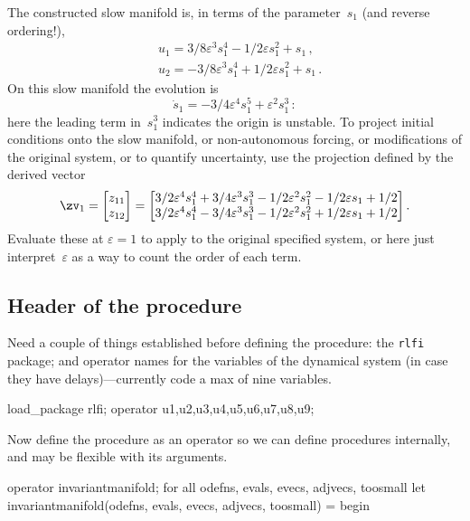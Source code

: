 \documentclass[11pt,a5paper]{article}
\def\eps{\varepsilon}
\begin{document}
The constructed slow manifold is, in terms of the
parameter~\(s_1\) (and reverse ordering!), 
\begin{align*}&
u_{1}=3/8 \eps^{3} s_{1}^{4}-1/2 \eps s_{1}^{2}+s_{1}\,,
\\&
u_{2}=-3/8 \eps^{3} s_{1}^{4}+1/2 \eps s_{1}^{2}+s_{1}\,.
\end{align*}
On this slow manifold the evolution is
\begin{equation*}
\dot s_{1}=-3/4 \eps^{4} s_{1}^{5}+\eps^{2} s_{1}^{3}\,:
\end{equation*}
here the leading term in~\(s_1^3\) indicates the origin is
unstable. To project initial conditions onto the slow
manifold, or non-autonomous forcing, or modifications of the
original system, or to quantify uncertainty, use the
projection defined by the derived vector
\begin{equation*}
\zv_1=\begin{bmatrix}z_{11}\\z_{12}\end{bmatrix}
=\begin{bmatrix}
3/2 \eps^{4} s_{1}^{4}+3/4 \eps^{3} s_{1}^{3}-1/2 \eps^{2} s_{1}
^{2}-1/2 \eps s_{1}+1/2
\\
3/2 \eps^{4} s_{1}^{4}-3/4 \eps^{3} s_{1}^{3}-1/2 \eps^{2} s_{1}
^{2}+1/2 \eps s_{1}+1/2
\end{bmatrix}.
\end{equation*}
Evaluate these at \(\eps=1\) to apply to the original
specified system, or here just interpret~\(\eps\) as a way
to count the order of each term.




\subsection{Header of the procedure}

Need a couple of things established before defining the
procedure: the \verb|rlfi| package; and operator names for
the variables of the dynamical system (in case they have
delays)---currently code a max of nine variables.
\begin{reduce}
load_package rlfi; 
operator u1,u2,u3,u4,u5,u6,u7,u8,u9;
\end{reduce}

Now define the procedure as an operator so we can define
procedures internally, and may be flexible with its
arguments.
\begin{reduce}
operator invariantmanifold;
for all odefns, evals, evecs, adjvecs, toosmall let
  invariantmanifold(odefns, evals, evecs, adjvecs, toosmall) 
  = begin 
\end{reduce}
\end{document}
